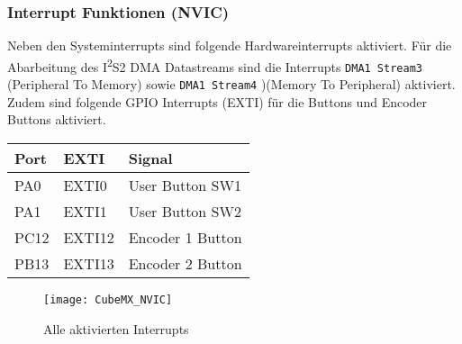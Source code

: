 \subsubsection{Interrupt Funktionen (NVIC)}
\label{sec:CubeMXNVIC}

Neben den Systeminterrupts sind folgende Hardwareinterrupts aktiviert.
Für die Abarbeitung des I\textsuperscript{2}S2 DMA Datastreams sind die Interrupts \texttt{DMA1 Stream3} (Peripheral To Memory) sowie \texttt{DMA1 Stream4} )(Memory To Peripheral) aktiviert.
Zudem sind folgende GPIO Interrupts (EXTI) für die Buttons und Encoder Buttons aktiviert.

\begin{table}[H]
	\centering
	\begin{tabular}{|l|l|l|}
		\hline
		\textbf{Port} & \textbf{EXTI} & \textbf{Signal}  \\ \hline
		PA0           & EXTI0         & User Button SW1  \\ \hline
		PA1           & EXTI1         & User Button SW2  \\ \hline
		PC12          & EXTI12        & Encoder 1 Button \\ \hline
		PB13          & EXTI13        & Encoder 2 Button \\ \hline
	\end{tabular}
\end{table}

\begin{figure}[H]
	\centering
	\texttt{[image: CubeMX\_NVIC]}
	\caption{Alle aktivierten Interrupts }
	\label{pic:CubeMX_NVIC}
\end{figure}


